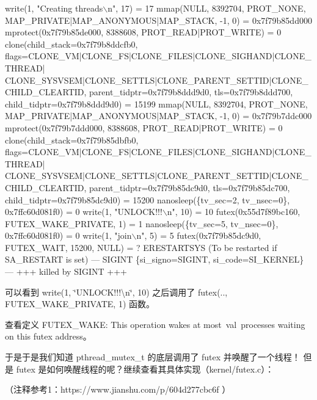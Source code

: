 \begin{DoxyCode}
write(1, \textcolor{stringliteral}{"Creating threads\(\backslash\)n"}, 17)      = 17
mmap(NULL, 8392704, PROT\_NONE, MAP\_PRIVATE|MAP\_ANONYMOUS|MAP\_STACK, -1, 0) = 0x7f79b85dd000
mprotect(0x7f79b85de000, 8388608, PROT\_READ|PROT\_WRITE) = 0
clone(child\_stack=0x7f79b8ddcfb0, flags=CLONE\_VM|CLONE\_FS|CLONE\_FILES|CLONE\_SIGHAND|CLONE\_THREAD|
      CLONE\_SYSVSEM|CLONE\_SETTLS|CLONE\_PARENT\_SETTID|CLONE\_CHILD\_CLEARTID, parent\_tidptr=0x7f79b8ddd9d0, tls=0x7f79b8ddd700,
       child\_tidptr=0x7f79b8ddd9d0) = 15199
mmap(NULL, 8392704, PROT\_NONE, MAP\_PRIVATE|MAP\_ANONYMOUS|MAP\_STACK, -1, 0) = 0x7f79b7ddc000
mprotect(0x7f79b7ddd000, 8388608, PROT\_READ|PROT\_WRITE) = 0
clone(child\_stack=0x7f79b85dbfb0, flags=CLONE\_VM|CLONE\_FS|CLONE\_FILES|CLONE\_SIGHAND|CLONE\_THREAD|
      CLONE\_SYSVSEM|CLONE\_SETTLS|CLONE\_PARENT\_SETTID|CLONE\_CHILD\_CLEARTID, parent\_tidptr=0x7f79b85dc9d0, tls=0x7f79b85dc700,
       child\_tidptr=0x7f79b85dc9d0) = 15200
nanosleep(\{tv\_sec=2, tv\_nsec=0\}, 0x7ffc60d081f0) = 0
write(1, \textcolor{stringliteral}{"UNLOCK!!!\(\backslash\)n"}, 10)             = 10
futex(0x55d7f89bc160, FUTEX\_WAKE\_PRIVATE, 1) = 1
nanosleep(\{tv\_sec=5, tv\_nsec=0\}, 0x7ffc60d081f0) = 0
write(1, \textcolor{stringliteral}{"join\(\backslash\)n"}, 5)                   = 5
futex(0x7f79b85dc9d0, FUTEX\_WAIT, 15200, NULL) = ? ERESTARTSYS (To be restarted \textcolor{keywordflow}{if} SA\_RESTART is \textcolor{keyword}{set})
--- SIGINT \{si\_signo=SIGINT, si\_code=SI\_KERNEL\} ---
+++ killed by SIGINT +++
\end{DoxyCode}


可以看到 write(1, \char`\"{}\+U\+N\+L\+O\+C\+K!!!\textbackslash{}n\char`\"{}, 10) 之后调用了 futex(.., F\+U\+T\+E\+X\+\_\+\+W\+A\+K\+E\+\_\+\+P\+R\+I\+V\+A\+TE, 1) 函数。

查看定义 F\+U\+T\+E\+X\+\_\+\+W\+A\+KE\+: This operation wakes at most val processes waiting on this futex address。

于是于是我们知道 pthread\+\_\+mutex\+\_\+t 的底层调用了 futex 并唤醒了一个线程！ 但是 futex 是如何唤醒线程的呢？继续查看其具体实现（kernel/futex.c）：

（注释参考1：https\+://www.jianshu.\+com/p/604d277cbc6f ）


